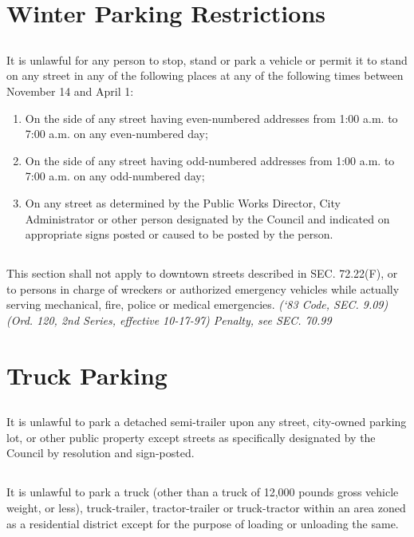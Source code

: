 \section{Winter Parking Restrictions}
\subsection{}
It is unlawful for any person to stop, stand or park a vehicle or permit it to stand on any street in any of the following places at any of the following times between November 14 and April 1:
\begin{enumerate}[{\indent}1)]
\item On the side of any street having even-numbered addresses from 1:00 a.m. to 7:00 a.m. on any even-numbered day;
\item On the side of any street having odd-numbered addresses from 1:00 a.m. to 7:00 a.m. on any odd-numbered day;
\item On any street as determined by the Public Works Director, City Administrator or other person designated by the Council and indicated on appropriate signs posted or caused to be posted by the person.
\end{enumerate}
\subsection{}
This section shall not apply to downtown streets described in SEC. 72.22(F), or to persons in charge of wreckers or authorized emergency vehicles while actually serving mechanical, fire, police or medical emergencies.\newline
\emph{(‘83 Code, SEC. 9.09)  (Ord. 120, 2nd Series, effective 10-17-97)  Penalty, see SEC. 70.99}

\section{Truck Parking}
\subsection{}
It is unlawful to park a detached semi-trailer upon any street, city-owned parking lot, or other public property except streets as specifically designated by the Council by resolution and sign-posted.
\subsection{}
It is unlawful to park a truck (other than a truck of 12,000 pounds gross vehicle weight, or less), truck-trailer, tractor-trailer or truck-tractor within an area zoned as a residential district except for the purpose of loading or unloading the same.
